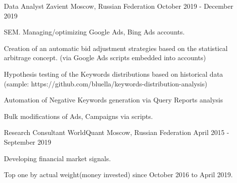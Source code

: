 
\begin{cventries}

\cventry
{Data Analyst} %
{Zavient} %
{Moscow, Russian Federation} %
{October 2019 - December 2019} %
{
  \begin{cvitems} %
    \item {SEM. Managing/optimizing Google Ads, Bing Ads accounts.}
    \item {Creation of an automatic bid adjustment strategies based on the statistical arbitrage concept. (via Google Ads scripts embedded into accounts)}
    \item {Hypothesis testing of the Keywords distributions based on historical data (sample: https://github.com/bluella/keywords-distribution-analysis)}
    \item {Automation of Negative Keywords generation via Query Reports analysis}
    \item {Bulk modifications of Ads, Campaigns via scripts.}
  \end{cvitems}
}


  \cventry
    {Research Consultant} %
    {WorldQuant} %
    {Moscow, Russian Federation} %
    {April 2015 - September 2019} %
    {
      \begin{cvitems} %
        \item {Developing financial market signals.}
        \item {Top one by actual weight(money invested) since October 2016 to April 2019. }
      \end{cvitems}
    }


\end{cventries}
